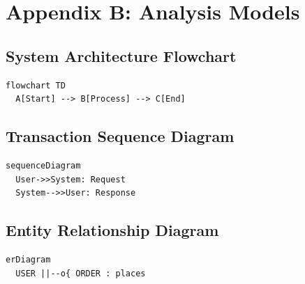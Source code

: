 \documentclass[11pt,a4paper]{article}
\begin{document}
\section{Appendix B: Analysis Models}
\subsection{System Architecture Flowchart}
\begin{lstlisting}[language={},caption={Flowchart Model (Mermaid Source)}]
flowchart TD
  A[Start] --> B[Process] --> C[End]
\end{lstlisting}

\subsection{Transaction Sequence Diagram}
\begin{lstlisting}[language={},caption={Sequence Model (Mermaid Source)}]
sequenceDiagram
  User->>System: Request
  System-->>User: Response
\end{lstlisting}

\subsection{Entity Relationship Diagram}
\begin{lstlisting}[language={},caption={Entity Relationship Model (Mermaid Source)}]
erDiagram
  USER ||--o{ ORDER : places
\end{lstlisting}
\end{document}
